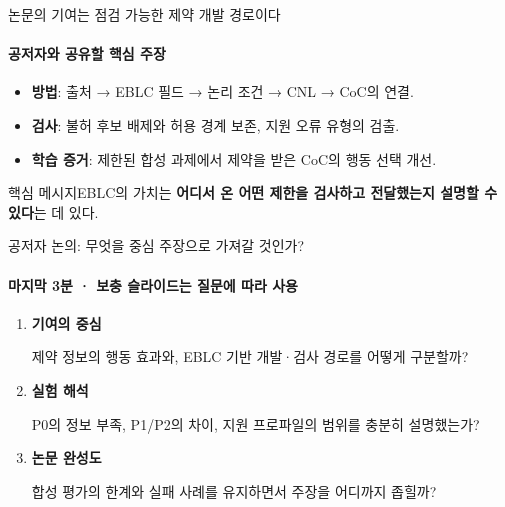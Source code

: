\documentclass[aspectratio=169,11pt]{beamer}
\newcommand{\source}[1]{\par\vspace{2mm}{\fontsize{8}{10}\selectfont\color{muted}근거: #1\par}}
\newcommand{\takeaway}[1]{\begin{block}{핵심 메시지}#1\end{block}}
\begin{document}
\begin{frame}{논문의 기여는 점검 가능한 제약 개발 경로이다}
  \framesubtitle{공저자와 공유할 핵심 주장}
  \begin{itemize}\setlength{\itemsep}{4mm}
    \item \textbf{방법}: 출처 → EBLC 필드 → 논리 조건 → CNL → CoC의 연결.
    \item \textbf{검사}: 불허 후보 배제와 허용 경계 보존, 지원 오류 유형의 검출.
    \item \textbf{학습 증거}: 제한된 합성 과제에서 제약을 받은 CoC의 행동 선택 개선.
  \end{itemize}
  \takeaway{EBLC의 가치는 \textbf{어디서 온 어떤 제한을 검사하고 전달했는지 설명할 수 있다}는 데 있다.}
  \source{원고 VII.B; VIII}
\end{frame}

\begin{frame}{공저자 논의: 무엇을 중심 주장으로 가져갈 것인가?}
  \framesubtitle{마지막 3분 · 보충 슬라이드는 질문에 따라 사용}
  \begin{enumerate}\setlength{\itemsep}{5mm}
    \item \textbf{기여의 중심}\par
      제약 정보의 행동 효과와, EBLC 기반 개발·검사 경로를 어떻게 구분할까?
    \item \textbf{실험 해석}\par
      P0의 정보 부족, P1/P2의 차이, 지원 프로파일의 범위를 충분히 설명했는가?
    \item \textbf{논문 완성도}\par
      합성 평가의 한계와 실패 사례를 유지하면서 주장을 어디까지 좁힐까?
  \end{enumerate}
\end{frame}
\end{document}
